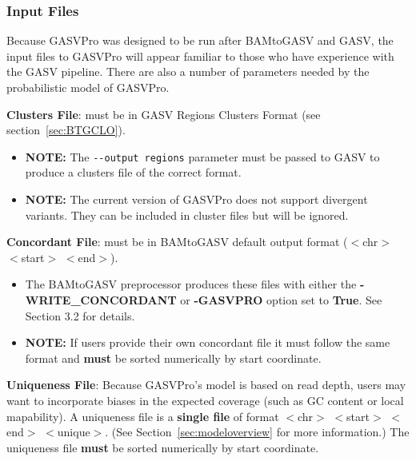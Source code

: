 \documentclass[11pt]{article}
\begin{document}
\subsubsection{Input Files}
Because GASVPro was designed to be run after BAMtoGASV and GASV, the input files to GASVPro will appear familiar to those who have experience with the GASV pipeline. There are also a number of parameters needed by the probabilistic model of GASVPro.

\begin{description}
\item{\bf Clusters File}: must be in GASV Regions Clusters Format (see section~\ref{sec:BTGCLO}). 
\begin{itemize}
\item {\bf NOTE:} The \verb+--output regions+ parameter must be passed to GASV to produce a clusters file of the correct format. 
\item {\bf NOTE:} The current version of GASVPro does not support divergent variants. They can be included in cluster files but will be ignored. 
\end{itemize}
\item{\bf Concordant File}: must be in BAMtoGASV default output format ($<$chr$>$ $<$start$>$ $<$end$>$). 
\begin{itemize}
\item The BAMtoGASV preprocessor produces these files with either the {\bf-WRITE\_CONCORDANT} or {\bf-GASVPRO} option set to {\bf True}. See Section 3.2 for details. 
\item {\bf NOTE:} If users provide their own concordant file it must follow the same format and {\bf must} be sorted numerically by start coordinate.
\end{itemize}
\item{\bf Uniqueness File}:  Because GASVPro's model is based on read depth, users may want to incorporate biases in the expected coverage (such as GC content or local mapability). A uniqueness file is a {\bf single file} of format $<$chr$>$ $<$start$>$ $<$end$>$ $<$unique$>$. (See Section~\ref{sec:modeloverview} for more information.) The uniqueness file {\bf must} be sorted numerically by start coordinate.
\end{description}
\end{document}
